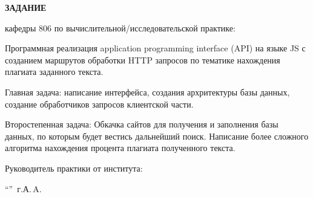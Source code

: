 \begin{center}
\bfseries{\large ЗАДАНИЕ}
\end{center}

кафедры 806 по вычислительной/исследовательской практике:

Программная реализация application programming interface (API) на языке JS с созданием маршрутов обработки HTTP запросов по тематике нахождения плагиата заданного текста.

Главная задача: написание интерфейса, создания архритектуры базы данных, создание обработчиков запросов клиентской части.

Второстепенная задача: Обкачка сайтов для получения и заполнения базы данных, по которым будет вестись дальнейший поиск. Написание более сложного алгоритма нахождения процента плагиата полученного текста.



\vspace*{\fill}
Руководитель практики от института:

\vspace{5pt}
\enquote{\hspace{0.5cm}}  \the\year\,г. А.\,A. 
\pagebreak